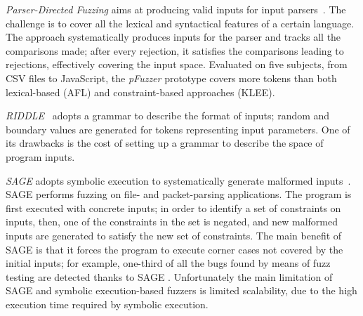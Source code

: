 \emph{Parser-Directed Fuzzing} aims at producing valid inputs for input parsers~\cite{mathis2019parser}. The challenge is to cover all the lexical and syntactical features of a certain language. The approach systematically produces inputs for the parser and tracks all the comparisons made; after every rejection, it satisfies the comparisons leading to rejections, effectively covering the input space. 
Evaluated on five subjects, from CSV files to JavaScript, the \emph{pFuzzer} prototype covers more tokens than both lexical-based (AFL) and constraint-based approaches (KLEE).

\emph{RIDDLE}~\cite{ghosh1998testing} adopts a grammar to describe the format of inputs; random and boundary values are generated for tokens representing input parameters.
One of its drawbacks is the cost of setting up a grammar to describe the space of program inputs.

\emph{SAGE} adopts symbolic execution to systematically generate malformed inputs~\cite{godefroid2012sage}. SAGE performs fuzzing on file- and packet-parsing applications. 
The program is first executed with concrete inputs; in order to identify a set of constraints on inputs, then, one of the constraints in the set is negated, and new malformed inputs are generated to satisfy the new set of constraints. 
The main benefit of SAGE is that it forces the program to execute corner cases not covered by the initial inputs; for example, 
one-third of all the bugs found by means of fuzz testing are detected thanks to SAGE \cite{bounimova2013billions}.
Unfortunately the main limitation of SAGE and symbolic execution-based fuzzers is limited scalability, due to the high execution time required by symbolic execution.

